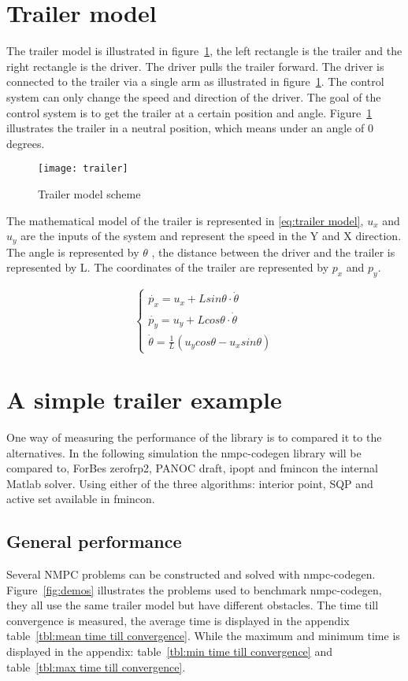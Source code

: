 \section{Trailer model}
The trailer model is illustrated in figure~\ref{fig:trailer model}, the left rectangle is the trailer and the right rectangle is the driver. The driver pulls the trailer forward. The driver is connected to the trailer via a single arm as illustrated in figure~\ref{fig:trailer model}. The control system can only change the speed and direction of the driver. The goal of the control system is to get the trailer at a certain position and angle. Figure~\ref{fig:trailer model} illustrates the trailer in a neutral position, which means under an angle of 0 degrees.

\begin{figure}
	\centering
	\texttt{[image: trailer]}
	\caption{Trailer model scheme}
	\label{fig:trailer model}
\end{figure}

The mathematical model of the trailer is represented in \eqref{eq:trailer model}, $u_x$ and $u_y$ are the inputs of the system and represent the speed in the Y and X direction. The angle is represented by $\theta$ , the distance between the driver and the trailer is represented by L. The coordinates of the trailer are represented by $p_x$ and $p_y$.

\begin{equation}
	\begin{cases}
		\dot{p_x} = u_x + L sin \theta \cdot \dot{\theta} \\
		\dot{p_y} = u_y + L cos \theta \cdot \dot{\theta} \\
		\dot{\theta} = \frac{1}{L}(u_ycos \theta - u_x sin \theta)	
	\end{cases}
	\label{eq:trailer model}
\end{equation}

\section{A simple trailer example}
One way of measuring the performance of the library is to compared it to the alternatives. In the following simulation the nmpc-codegen library will be compared to, ForBes zerofrp2, PANOC draft, ipopt and fmincon the internal Matlab solver. Using either of the three algorithms: interior point, SQP and active set available in fmincon.

\subsection{General performance}
Several NMPC problems can be constructed and solved with nmpc-codegen. Figure~\ref{fig:demos} illustrates the problems used to benchmark nmpc-codegen, they all use the same trailer model but have different obstacles. The time till convergence is measured, the average time is displayed in the appendix table~\ref{tbl:mean time till convergence}. While the maximum and minimum time is displayed in the appendix: table~\ref{tbl:min time till convergence} and table~\ref{tbl:max time till convergence}.

